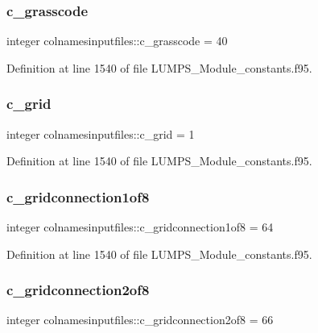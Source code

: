 \subsubsection{\texorpdfstring{c\+\_\+grasscode}{c\_grasscode}}
{\footnotesize\ttfamily integer colnamesinputfiles\+::c\+\_\+grasscode = 40}



Definition at line 1540 of file L\+U\+M\+P\+S\+\_\+\+Module\+\_\+constants.\+f95.

\mbox{\label{namespacecolnamesinputfiles_a334c7aef52fe2d0196e09b041ef19c9a}} 
\subsubsection{\texorpdfstring{c\+\_\+grid}{c\_grid}}
{\footnotesize\ttfamily integer colnamesinputfiles\+::c\+\_\+grid = 1}



Definition at line 1540 of file L\+U\+M\+P\+S\+\_\+\+Module\+\_\+constants.\+f95.

\mbox{\label{namespacecolnamesinputfiles_a2ea9c9a2febca1f86790acc7c1204557}} 
\subsubsection{\texorpdfstring{c\+\_\+gridconnection1of8}{c\_gridconnection1of8}}
{\footnotesize\ttfamily integer colnamesinputfiles\+::c\+\_\+gridconnection1of8 = 64}



Definition at line 1540 of file L\+U\+M\+P\+S\+\_\+\+Module\+\_\+constants.\+f95.

\mbox{\label{namespacecolnamesinputfiles_ab7547e93170074b4d8a1f092873025d7}} 
\subsubsection{\texorpdfstring{c\+\_\+gridconnection2of8}{c\_gridconnection2of8}}
{\footnotesize\ttfamily integer colnamesinputfiles\+::c\+\_\+gridconnection2of8 = 66}



